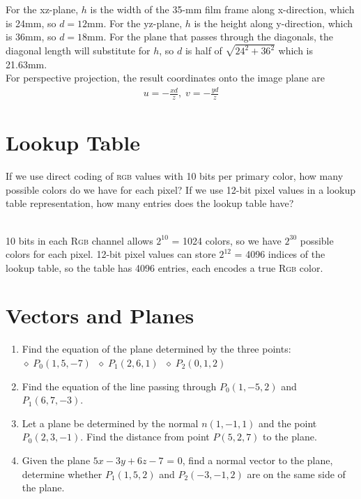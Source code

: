 \documentclass[11pt]{article}  %
\begin{document}
    \noindent For the xz-plane, $h$ is the width of the 35-mm film frame along x-direction, which is 24mm, so $d = 12$mm. For the yz-plane, $h$ is the height along y-direction, which is 36mm, so $d = 18$mm. For the plane that passes through the diagonals, the diagonal length will substitute for $h$, so $d$ is half of $\sqrt{24^2+36^2}$ which is 21.63mm.\\

    \noindent For perspective projection, the result coordinates onto the image plane are
    \begin{align*}
        u = -\frac{xd}{z},\; v = -\frac{yd}{z}
    \end{align*}

\section{Lookup Table}
    If we use direct coding of \textsc{rgb} values with 10 bits per primary color, how many possible colors do we have for each pixel? If we use 12-bit pixel values in a lookup table representation, how many entries does the lookup table have?\vspace{3mm}

\solution\\
    10 bits in each \textsc{Rgb} channel allows $2^{10}$ = 1024 colors, so we have $2^{30}$ possible colors for each pixel. 12-bit pixel values can store $2^{12}$ = 4096 indices of the lookup table, so the table has 4096 entries, each encodes a true \textsc{Rgb} color.

\section{Vectors and Planes}
    \begin{enumerate}[leftmargin=*]
        \item Find the equation of the plane determined by the three points:\vspace{3mm}\\
        $\diamond\; P_0(1, 5,-7)\;$
        $\diamond\; P_1(2, 6, 1)\;$
        $\diamond\; P_2(0, 1, 2)\;$
        \item Find the equation of the line passing through $P_0(1,-5,2)$ and $P_1(6,7,-3)$.
        \item Let a plane be determined by the normal $n(1,-1,1)$ and the point $P_0(2,3,-1)$. Find the distance from point $P(5,2,7)$ to the plane.
        \item Given the plane $5x - 3y + 6z - 7$ = 0, find a normal vector to the plane, determine whether $P_1(1,5,2)$ and $P_2(-3,-1,2)$ are on the same side of the plane.
    \end{enumerate}
\end{document}
